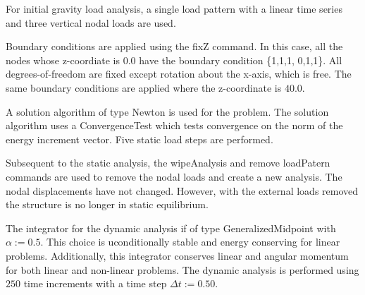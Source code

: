 \documentclass[12pt]{article}
\begin{document}
For initial gravity load analysis, a single load pattern 
with a linear time series and three vertical nodal loads are used. 

Boundary conditions are applied using the fixZ command.  In this case, 
all the nodes whose z-coordiate is $0.0$ have the boundary condition
\{1,1,1, 0,1,1\}.  All degrees-of-freedom are fixed except rotation 
about the x-axis, which is free. 
The same boundary conditions are applied where the
z-coordinate is $40.0$.


\vspace{0.2in}

A solution algorithm of type Newton is used for the 
problem. The solution algorithm uses a ConvergenceTest which tests
convergence on the norm of the energy increment vector. 
Five static load steps are performed.

Subsequent to the static analysis, the wipeAnalysis and 
remove loadPatern commands are used 
to remove the nodal loads and create a new analysis.  The nodal 
displacements have not changed.  However, with the external loads removed
the structure is no longer in static equilibrium.

The integrator for the dynamic analysis if of type 
GeneralizedMidpoint with $\alpha := 0.5$.  This choice 
is uconditionally stable and energy conserving for linear problems.
Additionally, this integrator conserves linear and
angular momentum for both linear and non-linear problems.
The dynamic analysis is performed using $250$ time increments with
a time step $\Delta t := 0.50$.
\end{document}
